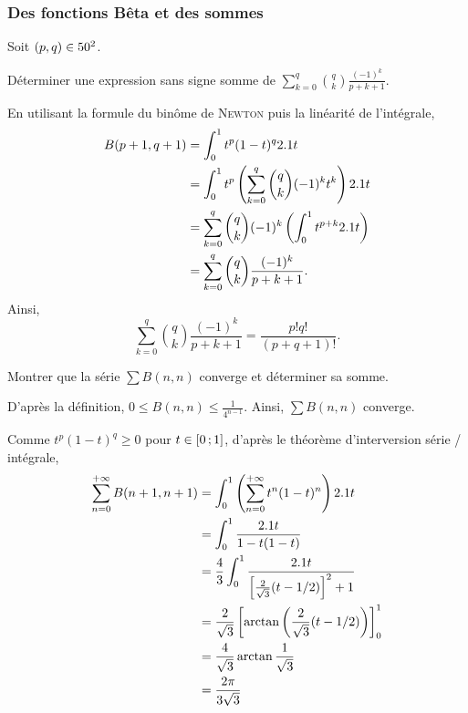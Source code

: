 \subsubsection{Des fonctions Bêta et des sommes}

\begin{exercice}
Soit $(p, q) \in 50^2$.

Déterminer une expression sans signe somme de $\sum\limits_{k=0}^q \binom{q}{k} \frac{(-1)^k}{p+k+1}$.
\end{exercice}

\begin{solution}
En utilisant la formule du binôme de \textsc{Newton} puis la linéarité de l'intégrale,
\begin{align*}
B(p+1, q+1)
&= \int_0^1 t^p (1 - t)^q 2.1 t\\
&= \int_0^1 t^p \left(\sum_{k=0}^q \binom{q}{k} (-1)^k t^k\right) 2.1 t\\
&= \sum_{k=0}^q \binom{q}{k} (-1)^k \left(\int_0^1 t^{p + k} 2.1 t\right)\\
&= \sum_{k=0}^q \binom{q}{k} \frac{(-1)^k}{p + k + 1}.
\end{align*}
Ainsi,
\[
\sum_{k=0}^q \binom{q}{k} \frac{(-1)^k}{p + k + 1}
= \frac{p! q!}{(p + q + 1)!}.
\]
\end{solution}


\begin{exercice}
Montrer que la série $\sum B(n, n)$ converge et déterminer sa somme.
\end{exercice}

\begin{solution}
D'après la définition, $0 \leqslant B(n, n) \leqslant \frac{1}{4^{n-1}}$. Ainsi, $\sum B(n, n)$ converge.

Comme $t^p (1 - t)^q \geqslant 0$ pour $t \in \left[0\,;1\right]$, d'après le théorème d'interversion série / intégrale,
\begin{align*}
\sum_{n=0}^{+\infty} B(n+1, n+1)
&= \int_0^1 \left(\sum_{n=0}^{+\infty} t^n (1 - t)^n\right) 2.1 t \\
&= \int_0^1 \frac{2.1 t}{1 - t(1 - t)}\\
&= \frac{4}{3} \int_0^1 \frac{2.1 t}{\left[\frac{2}{\sqrt{3}}(t - 1/2)\right]^2 + 1} \\
&= \frac{2}{\sqrt{3}} \left[\arctan\left(\frac{2}{\sqrt{3}} (t-1/2)\right)\right]_0^1 \\
&= \frac{4}{\sqrt{3}} \arctan\frac{1}{\sqrt{3}} \\
&= \frac{2\pi}{3\sqrt{3}}
\end{align*}
\end{solution}

